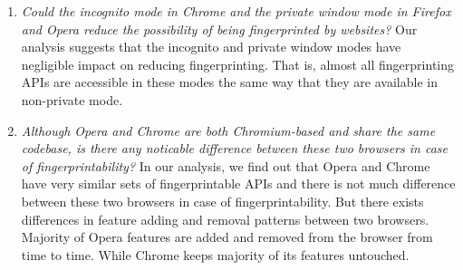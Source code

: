 \begin{enumerate}

\item {\em Could the incognito mode in Chrome and the private window mode in
  Firefox and Opera reduce the possibility of being fingerprinted by websites?} Our analysis
  suggests that the incognito and private window modes have negligible impact on
  reducing fingerprinting. That is, almost all fingerprinting APIs are accessible
  in these modes the same way that they are available in non-private mode.
    
\item {\em Although Opera and Chrome are both Chromium-based and share the same codebase,
  is there any noticable difference between these two browsers in case of fingerprintability?}
  In our analysis, we find out that Opera and Chrome have very similar sets of fingerprintable APIs
  and there is not much difference between these two browsers in case of fingerprintability.
  But there exists differences in feature adding and removal patterns between two browsers.
  Majority of Opera features are added and removed from the browser from time to time. While Chrome
  keeps majority of its features untouched.
\end{enumerate}

